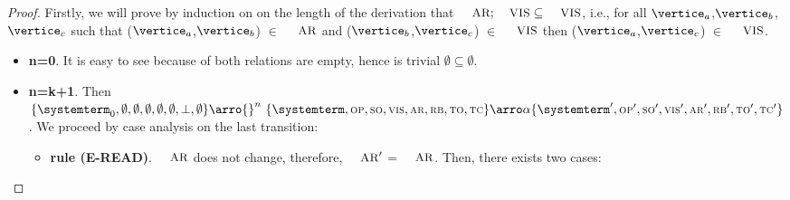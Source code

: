 \begin{proof} 
Firstly, we will prove by induction on on the length of the derivation that $\textsc{\small{AR}};\textsc{\small{VIS}} \subseteq \textsc{\small{VIS}}$, i.e., for all $\vertice_a$,$\vertice_b$,$\vertice_c$ such that ($\vertice_a$,$\vertice_b$) $\in$ $\textsc{\small{AR}}$ and ($\vertice_b$,$\vertice_c$) $\in$ $\textsc{\small{VIS}}$ then ($\vertice_a$,$\vertice_c$) $\in$ $\textsc{\small{VIS}}$.

\begin{itemize}
   \item{\bf n=0}. It is easy to see because of both relations are empty, hence is trivial $\emptyset \subseteq \emptyset$.
   \item{\bf n=k+1}. Then $\environmenttran{\systemterm_0}{\emptyset}{\emptyset}{\emptyset}{\emptyset}{\emptyset}{\undefined}{\emptyset} \arro{} ^n\ \environmenttran{\systemterm}{\op}{\so}{\vis}{\arb}{\rb}{\tx}{\tc} \arroi{\alpha} \environmenttran{\systemterm'}{\op'}{\so'}{\vis'}{\arb'}{\rb'}{\tx'}{\tc'}$. We proceed by case analysis on the last transition:
	
	\begin{itemize}
        \item {\bf rule (\textsc{E-READ})}. $\textsc{\small{AR}}$ does not change, therefore, $\textsc{\small{AR}}'$ = $\textsc{\small{AR}}$.  Then, there exists two cases: 
				

\end{itemize}
\end{itemize}
\end{proof}
